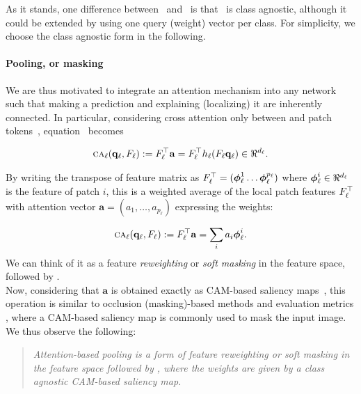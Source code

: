 \noindent As it stands, one difference between~ and~ is that~ 
is class agnostic, although it could be extended by using one query (weight) vector per class. For 
simplicity, we choose the class agnostic form in the following. %
\paragraph{Pooling, or masking}
We are thus motivated to integrate an attention mechanism into any network such that making a 
prediction and explaining (localizing) it are inherently connected. In particular, considering 
cross attention only between \cls and patch tokens~, equation~ becomes



\begin{align}
	\ca_\ell(\vq_\ell, F_\ell) \defn F_\ell\tran \mathbf{a} = F_\ell\tran h_\ell(F_\ell \vq_\ell) 
	\in \real^{d_\ell}.
\label{eq:CA}
\end{align}

\noindent By writing the transpose of feature matrix as $F_\ell^\top = ({\boldsymbol{\phi}}_\ell^1 \dots 
{\boldsymbol{\phi}}_\ell^{p_\ell})$ where $\vphi_\ell^i \in \real^{d_\ell}$ is the feature of patch $i$, 
this is a weighted average of the local patch features $F_\ell^\top$ with attention vector 
$\mathbf{a} = (a_1, \dots, a_{p_\ell})$ expressing the weights:

\begin{align}
	{\textsc{ca}}_\ell(\mathbf{q}_\ell, F_\ell) \mathrel{:=} F_\ell^\top \mathbf{a} = \sum_i a_i {\boldsymbol{\phi}}_\ell^i.
\label{eq:CA-gap}
\end{align}
We can think of it as a feature \emph{reweighting} or \emph{soft masking} in the feature space, 
followed by \gap.\\

\noindent Now, considering that $\mathbf{a}$ is obtained exactly as CAM-based saliency 
maps~, this operation is similar to occlusion (masking)-based methods 
\autocite{petsiuk2018rise, fong2017interpretable, fong2019understanding, schulz2020restricting, 
ribeiro2016should,wang2020score, zhang2023opti} and evaluation metrics \autocite{chattopadhay2018grad, 
petsiuk2018rise}, where a CAM-based saliency map is commonly used to mask the input image. \\

\noindent We thus observe the following:

\begin{quote}
	\emph{Attention-based pooling is a form of feature reweighting or soft masking in the feature 
	space followed by \gap, where the weights are given by a class agnostic CAM-based saliency map.}
\end{quote}

%